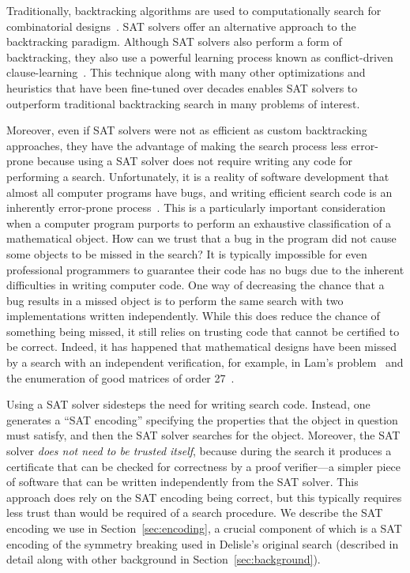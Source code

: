 \documentclass[runningheads]{llncs}
\begin{document}
Traditionally, backtracking algorithms are used to computationally search for combinatorial designs~\cite{kaski2006}.  SAT solvers offer an alternative approach to the backtracking paradigm.  Although SAT solvers also perform a form of backtracking, they also use a powerful learning process known as conflict-driven clause-learning~\cite{MarquesSilva1996}.  This technique along with many other optimizations and heuristics that have been fine-tuned over decades enables SAT solvers to outperform traditional backtracking search in many problems of interest.

Moreover, even if SAT solvers were not as efficient as custom backtracking approaches, they have the advantage of making the search process less error-prone because using a SAT solver does not require writing any code for performing a search.  Unfortunately, it is a reality of software development that almost all computer programs have bugs, and writing efficient search code is an inherently error-prone process~\cite{Lam1990}.  This is a particularly important consideration when a computer program purports to perform an exhaustive classification of a mathematical object.  How can we trust that a bug in the program did not cause some objects to be missed in the search?  It is typically impossible for even professional programmers to guarantee their code has no bugs due to the inherent difficulties in writing computer code.  One way of decreasing the chance that a bug results in a missed object is to perform the same search with two implementations written independently.  While this does reduce the chance of something being missed, it still relies on trusting code that cannot be certified to be correct.  Indeed, it has happened that mathematical designs have been missed by a search with an independent verification, for example, in Lam's problem~\cite{Bright2022} and the enumeration of good matrices of order 27~\cite{Bright2019}.

Using a SAT solver sidesteps the need for writing search code.  Instead, one generates a ``SAT encoding'' specifying the properties that the object in question must satisfy, and then the SAT solver searches for the object.  Moreover, the SAT solver \emph{does not need to be trusted itself}, because during the search it produces a certificate that can be checked for correctness by a proof verifier---a simpler piece of software that can be written independently from the SAT solver.  This approach does rely on the SAT encoding being correct, but this typically requires less trust than would be required of a search procedure.
We describe the SAT encoding we use in Section~\ref{sec:encoding}, a crucial component of which is a SAT encoding of the symmetry breaking used in Delisle's original search
(described in detail along with other background in Section~\ref{sec:background}).
\end{document}
